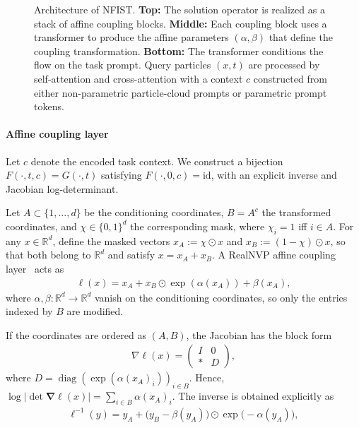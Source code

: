 \documentclass[preprint]{elsarticle}
\newcommand{\R}{\mathbb{R}}
\begin{document}
\begin{figure}[t]
\caption{
Architecture of NFIST.
\textbf{Top:} The solution operator is realized as a stack of affine coupling blocks.
\textbf{Middle:} Each coupling block uses a transformer to produce the affine parameters $(\alpha,\beta)$ that define the coupling transformation.
\textbf{Bottom:} The transformer conditions the flow on the task prompt. Query particles $(x,t)$ are processed by self-attention and cross-attention with a context $c$ constructed from either non-parametric particle-cloud prompts or parametric prompt tokens.
}
\label{fig:arch}
\end{figure}

\paragraph{Affine coupling layer}
Let $c$ denote the encoded task context. We construct a bijection
$F(\cdot,t,c)=G(\cdot,t)$ satisfying
$F(\cdot,0,c)=\mathrm{id}$,
with an explicit inverse and Jacobian log-determinant.

Let $A\subset\{1,\ldots,d\}$ be the conditioning coordinates,
$B=A^c$ the transformed coordinates, and
$\chi\in\{0,1\}^d$ the corresponding mask, where
$\chi_i=1$ iff $i\in A$. For any $x\in\R^d$, define the masked vectors $x_A:=\chi\odot x$ and $x_B:=(1-\chi)\odot x$, so that both belong to $\R^d$ and satisfy
$x=x_A+x_B$. A RealNVP affine coupling layer~\cite{dinh2017realnvp}
acts as
\begin{align}
\ell(x)=x_A+x_B\odot\exp(\alpha(x_A))+\beta(x_A),
\label{equ:coupling}
\end{align}
where $\alpha,\beta:\R^d\to\R^d$ vanish on the conditioning coordinates, so only the entries indexed by $B$ are modified.

If the coordinates are ordered as $(A,B)$, the Jacobian has the block form
\begin{align}
\nabla\ell(x) = \begin{pmatrix}
I & 0\\
* & D
\end{pmatrix},
\label{equ:coupling_jac}
\end{align}
where $D=\operatorname{diag}\!\left(
\exp(\alpha(x_A)_i)
\right)_{i\in B}$. Hence, $\log \bigl|\det \boldsymbol{\nabla}\ell(x)\bigr|=\sum_{i\in B} \alpha(x_A)_i$. The inverse is obtained explicitly as
\begin{align}
\ell^{-1}(y)
=
y_A
+
\bigl(y_B-\beta(y_A)\bigr)
\odot
\exp\bigl(-\alpha(y_A)\bigr),
\label{equ:coupling_inv}
\end{align}
\end{document}
